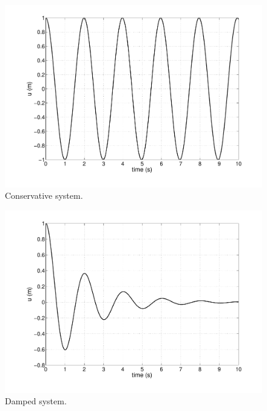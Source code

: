 \begin{multicols}{2}

\begin{figure}[H]
\centering
\includegraphics[scale=0.3, trim = 20mm 0mm 0mm 0mm, clip]
{./Figures/2-CauchyProblem/D=0.pdf}
\caption{Conservative system.}
\end{figure}

\columnbreak

\begin{figure}[H]
\centering
\includegraphics[scale=0.3, trim = 20mm 0mm 0mm 0mm, clip]
{./Figures/2-CauchyProblem/D=1.pdf}
\caption{Damped system.}
\end{figure}

\end{multicols}

